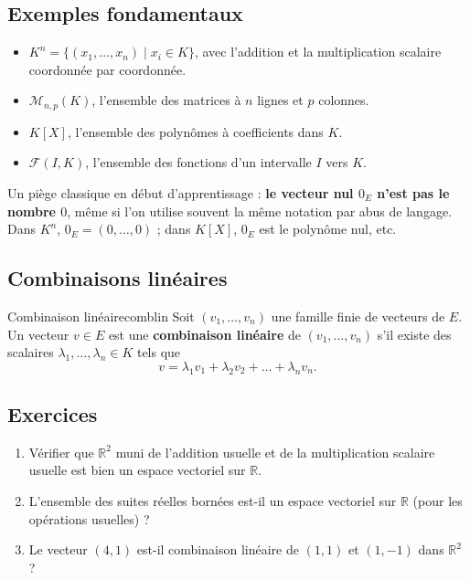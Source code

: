 \documentclass[theme=pringlea]{myrtille}
\begin{document}
\subsection{Exemples fondamentaux}
\begin{itemize}
    \item $K^n = \{(x_1, \dots, x_n) \mid x_i \in K\}$, avec l'addition et la multiplication scalaire coordonnée par coordonnée.
    \item $\mathcal{M}_{n,p}(K)$, l'ensemble des matrices à $n$ lignes et $p$ colonnes.
    \item $K[X]$, l'ensemble des polynômes à coefficients dans $K$.
    \item $\mathcal{F}(I, K)$, l'ensemble des fonctions d'un intervalle $I$ vers $K$.
\end{itemize}

\begin{warnbox}
Un piège classique en début d'apprentissage : \textbf{le vecteur nul $0_E$ n'est pas le nombre $0$}, même si l'on utilise souvent la même notation par abus de langage. Dans $K^n$, $0_E = (0, \dots, 0)$ ; dans $K[X]$, $0_E$ est le polynôme nul, etc.
\end{warnbox}

\subsection{Combinaisons linéaires}
\begin{myrdef}{Combinaison linéaire}{comblin}
Soit $(v_1, \dots, v_n)$ une famille finie de vecteurs de $E$. Un vecteur $v \in E$ est une \textbf{combinaison linéaire} de $(v_1, \dots, v_n)$ s'il existe des scalaires $\lambda_1, \dots, \lambda_n \in K$ tels que
\[ v = \lambda_1 v_1 + \lambda_2 v_2 + \dots + \lambda_n v_n. \]
\end{myrdef}

\subsection{Exercices}
\begin{enumerate}
    \item Vérifier que $\mathbb{R}^2$ muni de l'addition usuelle et de la multiplication scalaire usuelle est bien un espace vectoriel sur $\mathbb{R}$.
    \item L'ensemble des suites réelles bornées est-il un espace vectoriel sur $\mathbb{R}$ (pour les opérations usuelles) ?
    \item Le vecteur $(4, 1)$ est-il combinaison linéaire de $(1,1)$ et $(1,-1)$ dans $\mathbb{R}^2$ ?
\end{enumerate}
\end{document}
